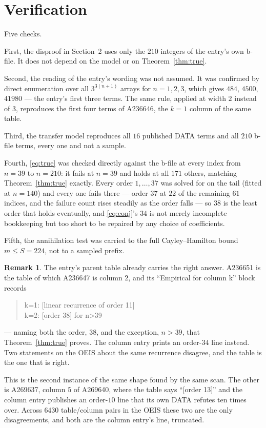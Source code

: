 \documentclass[11pt,a4paper]{article}
\theoremstyle{plain}
\theoremstyle{definition}
\newtheorem{remark}[theorem]{Remark}
\begin{document}
\section{Verification}

Five checks.

First, the disproof in Section~2 uses only the $210$ integers of the entry's own b-file. It
does not depend on the model or on Theorem~\ref{thm:true}.

Second, the reading of the entry's wording was not assumed. It was confirmed by direct
enumeration over all $3^{3(n+1)}$ arrays for $n=1,2,3$, which gives $484$, $4500$, $41980$
--- the entry's first three terms. The same rule, applied at width $2$ instead of $3$,
reproduces the first four terms of A236646, the $k=1$ column of the same table.

Third, the transfer model reproduces all $16$ published DATA terms and all $210$ b-file
terms, every one and not a sample.

Fourth, \eqref{eq:true} was checked directly against the b-file at every index from $n=39$
to $n=210$: it fails at $n=39$ and holds at all $171$ others, matching
Theorem~\ref{thm:true} exactly. Every order $1,\dots,37$ was solved for on the tail
(fitted at $n=140$) and every one fails there --- order $37$ at $22$ of the remaining $61$
indices, and the failure count rises steadily as the order falls --- so $38$ is the least
order that holds eventually, and \eqref{eq:conj}'s $34$ is not merely incomplete
bookkeeping but too short to be repaired by any choice of coefficients.

Fifth, the annihilation test was carried to the full Cayley--Hamilton bound $m\le S=224$,
not to a sampled prefix.

\begin{remark}
The entry's parent table already carries the right answer. A236651 is the table of which
A236647 is column $2$, and its ``Empirical for column k'' block records
\begin{quote}\small
k=1: [linear recurrence of order 11]\\
k=2: [order 38] for n>39
\end{quote}
--- naming both the order, $38$, and the exception, $n>39$, that
Theorem~\ref{thm:true} proves. The column entry prints an order-$34$ line instead. Two
statements on the OEIS about the same recurrence disagree, and the table is the one that is
right.

This is the second instance of the same shape found by the same scan. The other is A269637,
column $5$ of A269640, where the table says ``[order 13]'' and the column entry publishes an
order-$10$ line that its own DATA refutes ten times over. Across $6430$ table/column pairs in
the OEIS these two are the only disagreements, and both are the column entry's line, truncated.
\end{remark}
\end{document}
